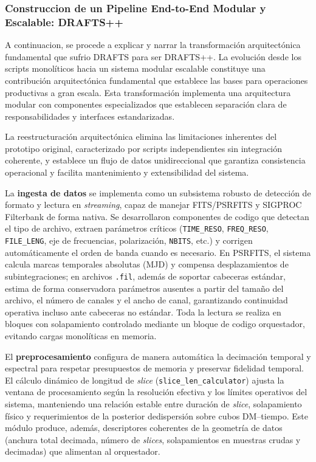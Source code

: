 \subsubsection{Construccion de un Pipeline End-to-End Modular y Escalable: DRAFTS++}

A continuacion, se procede a explicar y narrar la transformación arquitectónica fundamental que sufrio DRAFTS para ser DRAFTS++. La evolución desde los scripts monolíticos hacia un sistema modular escalable constituye una contribución arquitectónica fundamental que establece las bases para operaciones productivas a gran escala. Esta transformación implementa una arquitectura modular con componentes especializados que establecen separación clara de responsabilidades y interfaces estandarizadas.

La reestructuración arquitectónica elimina las limitaciones inherentes del prototipo original, caracterizado por scripts independientes sin integración coherente, y establece un flujo de datos unidireccional que garantiza consistencia operacional y facilita mantenimiento y extensibilidad del sistema.

La \textbf{ingesta de datos} se implementa como un subsistema robusto de detección de formato y lectura en \emph{streaming}, capaz de manejar FITS/PSRFITS y SIGPROC Filterbank de forma nativa. Se desarrollaron componentes de codigo que detectan el tipo de archivo, extraen parámetros críticos (\texttt{TIME\_RESO}, \texttt{FREQ\_RESO}, \texttt{FILE\_LENG}, eje de frecuencias, polarización, \texttt{NBITS}, etc.) y corrigen automáticamente el orden de banda cuando es necesario. En PSRFITS, el sistema calcula marcas temporales absolutas (MJD) y compensa desplazamientos de subintegraciones; en archivos \texttt{.fil}, además de soportar cabeceras estándar, estima de forma conservadora parámetros ausentes a partir del tamaño del archivo, el número de canales y el ancho de canal, garantizando continuidad operativa incluso ante cabeceras no estándar. Toda la lectura se realiza en bloques con solapamiento controlado mediante un bloque de codigo orquestador, evitando cargas monolíticas en memoria.

El \textbf{preprocesamiento} configura de manera automática la decimación temporal y espectral para respetar presupuestos de memoria y preservar fidelidad temporal. El cálculo dinámico de longitud de \emph{slice} (\texttt{slice\_len\_calculator}) ajusta la ventana de procesamiento según la resolución efectiva y los límites operativos del sistema, manteniendo una relación estable entre duración de \emph{slice}, solapamiento físico y requerimientos de la posterior dedispersión sobre cubos DM--tiempo. Este módulo produce, además, descriptores coherentes de la geometría de datos (anchura total decimada, número de \emph{slices}, solapamientos en muestras crudas y decimadas) que alimentan al orquestador.

